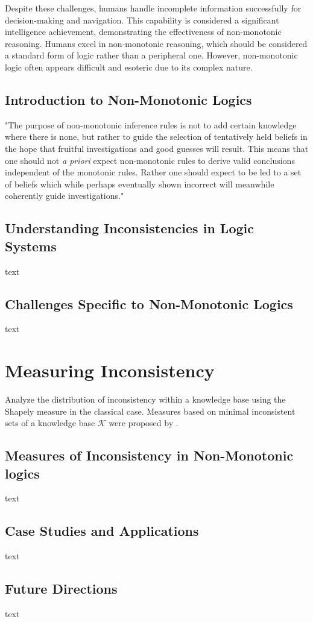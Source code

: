 Despite these challenges, humans handle incomplete information successfully for decision-making and navigation.
This capability is considered a significant intelligence achievement, demonstrating the effectiveness of non-monotonic reasoning.
Humans excel in non-monotonic reasoning, which should be considered a standard form of logic rather than a peripheral one.
However, non-monotonic logic often appears difficult and esoteric due to its complex nature.

\subsection{Introduction to Non-Monotonic Logics}
"The purpose of non-monotonic inference rules is not to add certain knowledge where there is none, but rather to guide the selection of tentatively held beliefs in the hope that fruitful investigations and good guesses will result.
This means that one should not \textit{a priori} expect non-monotonic rules to derive valid conclusions independent of the monotonic rules.
Rather one should expect to be led to a set of beliefs which while perhaps eventually shown incorrect will meanwhile coherently guide investigations."\\
\cite[p. 46]{mcdermott_non-monotonic_1980}

\subsection{Understanding Inconsistencies in Logic Systems}
text

\subsection{Challenges Specific to Non-Monotonic Logics}
text

\section{Measuring Inconsistency}
Analyze the distribution of inconsistency within a knowledge base using the Shapely measure \cite{hunter_measure_2010} in the classical case.
Measures based on minimal inconsistent sets of a knowledge base \(\mathcal{K}\) \cite{jabbour_mis_2016} were proposed by \cite{ulbricht_measuring_2018}.

\subsection{Measures of Inconsistency in Non-Monotonic logics}
text

\subsection{Case Studies and Applications}
text

\subsection{Future Directions}
text
